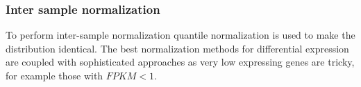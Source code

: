 		\subsubsection{Inter sample normalization}
		To perform inter-sample normalization quantile normalization is used to make the distribution identical.
		The best normalization methods for differential expression are coupled with sophisticated approaches as very low expressing genes are tricky, for example those with $FPKM<1$.
